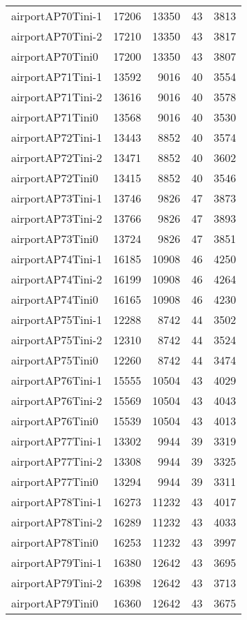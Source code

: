 \begin{tabular}{lrrrr}
airportAP70Tini-1 & 17206 & 13350 & 43 & 3813 \\
airportAP70Tini-2 & 17210 & 13350 & 43 & 3817 \\
airportAP70Tini0 & 17200 & 13350 & 43 & 3807 \\
airportAP71Tini-1 & 13592 & 9016 & 40 & 3554 \\
airportAP71Tini-2 & 13616 & 9016 & 40 & 3578 \\
airportAP71Tini0 & 13568 & 9016 & 40 & 3530 \\
airportAP72Tini-1 & 13443 & 8852 & 40 & 3574 \\
airportAP72Tini-2 & 13471 & 8852 & 40 & 3602 \\
airportAP72Tini0 & 13415 & 8852 & 40 & 3546 \\
airportAP73Tini-1 & 13746 & 9826 & 47 & 3873 \\
airportAP73Tini-2 & 13766 & 9826 & 47 & 3893 \\
airportAP73Tini0 & 13724 & 9826 & 47 & 3851 \\
airportAP74Tini-1 & 16185 & 10908 & 46 & 4250 \\
airportAP74Tini-2 & 16199 & 10908 & 46 & 4264 \\
airportAP74Tini0 & 16165 & 10908 & 46 & 4230 \\
airportAP75Tini-1 & 12288 & 8742 & 44 & 3502 \\
airportAP75Tini-2 & 12310 & 8742 & 44 & 3524 \\
airportAP75Tini0 & 12260 & 8742 & 44 & 3474 \\
airportAP76Tini-1 & 15555 & 10504 & 43 & 4029 \\
airportAP76Tini-2 & 15569 & 10504 & 43 & 4043 \\
airportAP76Tini0 & 15539 & 10504 & 43 & 4013 \\
airportAP77Tini-1 & 13302 & 9944 & 39 & 3319 \\
airportAP77Tini-2 & 13308 & 9944 & 39 & 3325 \\
airportAP77Tini0 & 13294 & 9944 & 39 & 3311 \\
airportAP78Tini-1 & 16273 & 11232 & 43 & 4017 \\
airportAP78Tini-2 & 16289 & 11232 & 43 & 4033 \\
airportAP78Tini0 & 16253 & 11232 & 43 & 3997 \\
airportAP79Tini-1 & 16380 & 12642 & 43 & 3695 \\
airportAP79Tini-2 & 16398 & 12642 & 43 & 3713 \\
airportAP79Tini0 & 16360 & 12642 & 43 & 3675 \\

\end{tabular}
